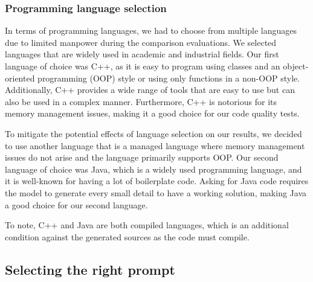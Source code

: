 \subsubsection{Programming language selection}

In terms of programming languages, we had to choose from multiple languages due to limited manpower during the comparison evaluations.
We selected languages that are widely used in academic and industrial fields.
Our first language of choice was C++, as it is easy to program using classes and an object-oriented programming (OOP) style or using only functions in a non-OOP style.
Additionally, C++ provides a wide range of tools that are easy to use but can also be used in a complex manner.
Furthermore, C++ is notorious for its memory management issues, making it a good choice for our code quality tests.

To mitigate the potential effects of language selection on our results, we decided to use another language that is a managed language where memory management issues do not arise and the language primarily supports OOP.
Our second language of choice was Java, which is a widely used programming language, and it is well-known for having a lot of boilerplate code.
Asking for Java code requires the model to generate every small detail to have a working solution, making Java a good choice for our second language.

To note, C++ and Java are both compiled languages, which is an additional condition against the generated sources as the code must compile.
\subsection{Selecting the right prompt}

